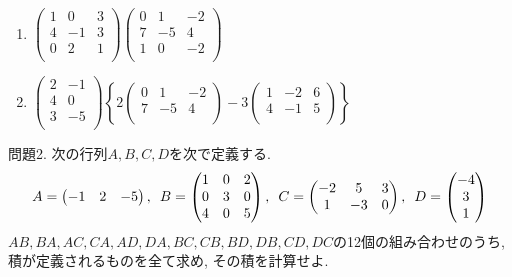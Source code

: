 \documentclass[dvipdfmx,a4paper,11pt]{article}
\theoremstyle{definition}
\begin{document}
 \begin{enumerate}
   \setlength{\parskip}{0cm} %
  \setlength{\itemsep}{0cm} %
  \item 
$
\begin{pmatrix}
 1& 0 & 3\\
 4 &-1&3\\
 0 & 2& 1\\
 \end{pmatrix}
 \begin{pmatrix}
 0 &1&-2 \\
 7&-5&4\\
 1 &0&-2 \\
 \end{pmatrix}
 $
 \item $
\begin{pmatrix}
 2 &-1 \\
 4 &0 \\
 3&-5\\
 \end{pmatrix}
 \left\{
 2
 \begin{pmatrix}
 0 &1&-2 \\
 7&-5&4\\
 \end{pmatrix}
 - 3
  \begin{pmatrix}
 1 &-2&6 \\
 4&-1&5\\
 \end{pmatrix}
\right\}
 $
 \end{enumerate}
 
\vspace{5pt}
 問題2. 次の行列$A,B,C,D$を次で定義する.
 $$
  A=\begin{pmatrix} %
 -1 & 2 &-5  \\
 \end{pmatrix} 
 \text{, \,\,} 
B= \begin{pmatrix} %
 1& 0 & 2\\
 0 & 3 & 0\\
 4 & 0 & 5 \\
 \end{pmatrix} %
 \text{, \,\,} 
 C=
  \begin{pmatrix}
 -2 &5 & 3\\
1 &-3&0  \\
 \end{pmatrix}
 \text{, \,\,} 
 D= \begin{pmatrix} %
 -4\\
 3 \\
 1
 \end{pmatrix}
 $$
 $AB, BA, AC, CA, AD, DA, BC, CB, BD, DB, CD, DC$の12個の組み合わせのうち, 積が定義されるものを全て求め, その積を計算せよ.
 
\end{document}
